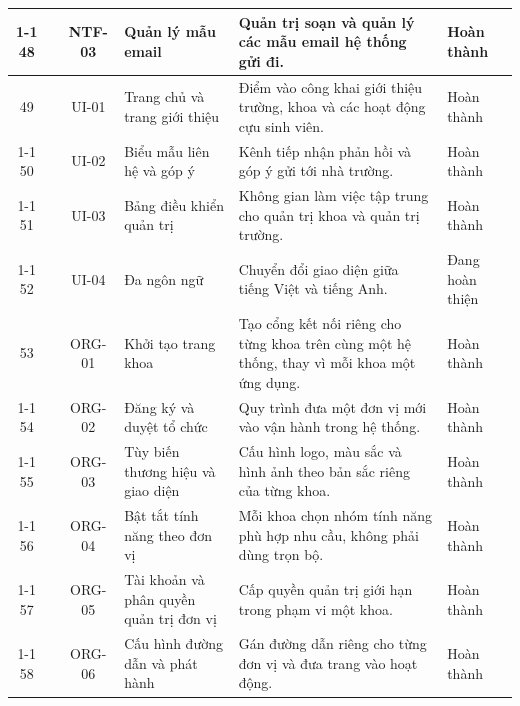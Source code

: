 \documentclass[12pt,a4paper,oneside]{report}
\begin{document}
\begin{landscape}
\begin{longtable}{|c|>{\raggedright\arraybackslash}p{3.1cm}|c|>{\raggedright\arraybackslash}p{4.6cm}|>{\raggedright\arraybackslash}p{8.4cm}|>{\raggedright\arraybackslash}p{2.4cm}|}
\cline{1-1}\cline{3-6}
\cellcolor{oldrow}48 & \multirow{-3}{2.4cm}{\cellcolor{oldrow}\textbf{Thông báo}} & \cellcolor{oldrow}NTF-03 & \cellcolor{oldrow}Quản lý mẫu email & \cellcolor{oldrow}Quản trị soạn và quản lý các mẫu email hệ thống gửi đi. & \cellcolor{oldrow}Hoàn thành \\
\hline
\cellcolor{oldrow}49 & \cellcolor{oldrow} & \cellcolor{oldrow}UI-01 & \cellcolor{oldrow}Trang chủ và trang giới thiệu & \cellcolor{oldrow}Điểm vào công khai giới thiệu trường, khoa và các hoạt động cựu sinh viên. & \cellcolor{oldrow}Hoàn thành \\
\cline{1-1}\cline{3-6}
\cellcolor{oldrow}50 & \cellcolor{oldrow} & \cellcolor{oldrow}UI-02 & \cellcolor{oldrow}Biểu mẫu liên hệ và góp ý & \cellcolor{oldrow}Kênh tiếp nhận phản hồi và góp ý gửi tới nhà trường. & \cellcolor{oldrow}Hoàn thành \\
\cline{1-1}\cline{3-6}
\cellcolor{oldrow}51 & \cellcolor{oldrow} & \cellcolor{oldrow}UI-03 & \cellcolor{oldrow}Bảng điều khiển quản trị & \cellcolor{oldrow}Không gian làm việc tập trung cho quản trị khoa và quản trị trường. & \cellcolor{oldrow}Hoàn thành \\
\cline{1-1}\cline{3-6}
\cellcolor{oldrow}52 & \multirow{-4}{2.4cm}{\cellcolor{oldrow}\textbf{Giao diện công khai}} & \cellcolor{oldrow}UI-04 & \cellcolor{oldrow}Đa ngôn ngữ & \cellcolor{oldrow}Chuyển đổi giao diện giữa tiếng Việt và tiếng Anh. & \cellcolor{oldrow}Đang hoàn thiện \\
\hline
53 &  & ORG-01 & Khởi tạo trang khoa & Tạo cổng kết nối riêng cho từng khoa trên cùng một hệ thống, thay vì mỗi khoa một ứng dụng. & Hoàn thành \\
\cline{1-1}\cline{3-6}
54 &  & ORG-02 & Đăng ký và duyệt tổ chức & Quy trình đưa một đơn vị mới vào vận hành trong hệ thống. & Hoàn thành \\
\cline{1-1}\cline{3-6}
55 &  & ORG-03 & Tùy biến thương hiệu và giao diện & Cấu hình logo, màu sắc và hình ảnh theo bản sắc riêng của từng khoa. & Hoàn thành \\
\cline{1-1}\cline{3-6}
56 &  & ORG-04 & Bật tắt tính năng theo đơn vị & Mỗi khoa chọn nhóm tính năng phù hợp nhu cầu, không phải dùng trọn bộ. & Hoàn thành \\
\cline{1-1}\cline{3-6}
57 &  & ORG-05 & Tài khoản và phân quyền quản trị đơn vị & Cấp quyền quản trị giới hạn trong phạm vi một khoa. & Hoàn thành \\
\cline{1-1}\cline{3-6}
58 & \multirow{-6}{2.4cm}{\textbf{Tổ chức và đa đơn vị}} & ORG-06 & Cấu hình đường dẫn và phát hành & Gán đường dẫn riêng cho từng đơn vị và đưa trang vào hoạt động. & Hoàn thành \\

\end{longtable}
\end{landscape}
\end{document}
